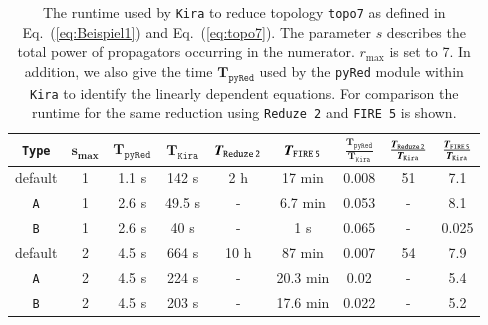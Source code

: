 \documentclass[a4paper,12pt]{scrartcl}
\newcommand*{\bm}{\boldsymbol}
\newcommand*{\kira}{\texttt{Kira}}
\newcommand*{\pyred}{\texttt{pyRed}}
\newcommand*{\firefive}{\texttt{FIRE\,5}}
\newcommand*{\reduzetwo}{\texttt{Reduze\,2}}
\def\Eq#1{{Eq.~(\ref{#1})}}
\begin{document}
\begin{table}[htpb]
\caption{The runtime used by \kira{} to reduce topology \texttt{topo7} as
  defined in \Eq{eq:Beispiel1} and \Eq{eq:topo7}. The parameter $s$ describes
  the total power of propagators occurring in the numerator. $r_{\max}$ is set
  to 7. In addition, we also give the time $\bm{T_\pyred}$ used by the \pyred{}
  module within \kira{} to identify the linearly dependent equations. For
  comparison the runtime for the same reduction using \reduzetwo{} and \firefive{} is shown.
  \label{tab:topo7m}}
\begin{center}\renewcommand{\arraystretch}{1.8}
  \begin{tabular}[\linewidth]{ccccccccc}
    \hline
    \texttt{Type}&
    $\bm{s_{\max}}$& $\bm{T_\pyred}$ & $\bm{T_\kira}$&
    $\bm{T_\reduzetwo}$&$\bm{T_\firefive}$& $\frac{\bm{T_\pyred}}{\bm{T_\kira}}$ &
    $\frac{\bm{T_\reduzetwo}}{\bm{T_\kira}}$ &
    $\frac{\bm{T_\firefive}}{\bm{T_\kira}}$\\
    \hline
    default   &1 & 1.1 s & 142 s    & 2 h    & 17 min  & 0.008 & 51  & 7.1    \\\hline%
    \texttt{A}&1 & 2.6 s & 49.5 s   & -      & 6.7 min & 0.053 & -   & 8.1 \\\hline%
    \texttt{B}&1 & 2.6 s & 40 s     & -      & 1 s     & 0.065 & -   & 0.025  \\\hline\hline%
%    
    default   &2 & 4.5 s & 664 s    & 10 h   & 87 min  & 0.007 & 54  & 7.9   \\\hline%
    \texttt{A}&2 & 4.5 s & 224 s    & -      & 20.3 min& 0.02  & -   & 5.4    \\\hline%
    \texttt{B}&2 & 4.5 s & 203 s    & -      & 17.6 min& 0.022 & -   & 5.2   \\\hline\hline%

\end{tabular}
\end{center}
\end{table}
\end{document}
